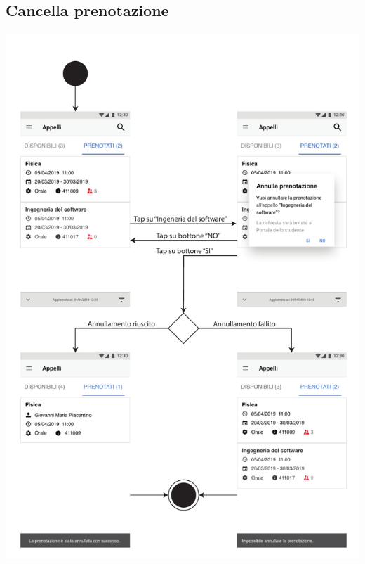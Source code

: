 \subsection{Cancella prenotazione}
\begin{center}
	\includegraphics[width=6in]{imgs/gruppo1/activity_diagrams/AD12_cancella_prenotazione.pdf}
\end{center}
\newpage


